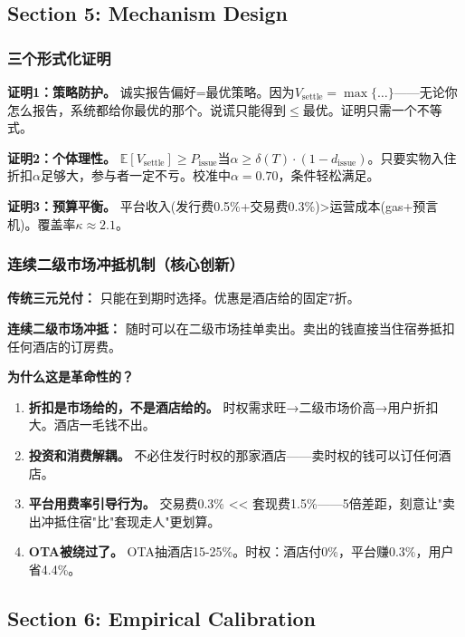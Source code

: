 \documentclass[12pt,a4paper]{ctexart}
\begin{document}
\subsection{Section 5: Mechanism Design}

\subsubsection{三个形式化证明}

\textbf{证明1：策略防护。} 诚实报告偏好=最优策略。因为$V_{\text{settle}} = \max\{\ldots\}$——无论你怎么报告，系统都给你最优的那个。说谎只能得到$\leq$最优。证明只需一个不等式。

\textbf{证明2：个体理性。} $\mathbb{E}[V_{\text{settle}}] \geq P_{\text{issue}}$当$\alpha \geq \delta(T) \cdot (1-d_{\text{issue}})$。只要实物入住折扣$\alpha$足够大，参与者一定不亏。校准中$\alpha=0.70$，条件轻松满足。

\textbf{证明3：预算平衡。} 平台收入(发行费0.5\%+交易费0.3\%)>运营成本(gas+预言机)。覆盖率$\kappa \approx 2.1$。

\subsubsection{连续二级市场冲抵机制（核心创新）}

\textbf{传统三元兑付：} 只能在到期时选择。优惠是酒店给的固定7折。

\textbf{连续二级市场冲抵：} 随时可以在二级市场挂单卖出。卖出的钱直接当住宿券抵扣任何酒店的订房费。

\textbf{为什么这是革命性的？}
\begin{enumerate}[nosep]
    \item \textbf{折扣是市场给的，不是酒店给的。} 时权需求旺→二级市场价高→用户折扣大。酒店一毛钱不出。
    \item \textbf{投资和消费解耦。} 不必住发行时权的那家酒店——卖时权的钱可以订任何酒店。
    \item \textbf{平台用费率引导行为。} 交易费0.3\% << 套现费1.5\%——5倍差距，刻意让"卖出冲抵住宿"比"套现走人"更划算。
    \item \textbf{OTA被绕过了。} OTA抽酒店15-25\%。时权：酒店付0\%，平台赚0.3\%，用户省4.4\%。
\end{enumerate}

\subsection{Section 6: Empirical Calibration}
\end{document}
